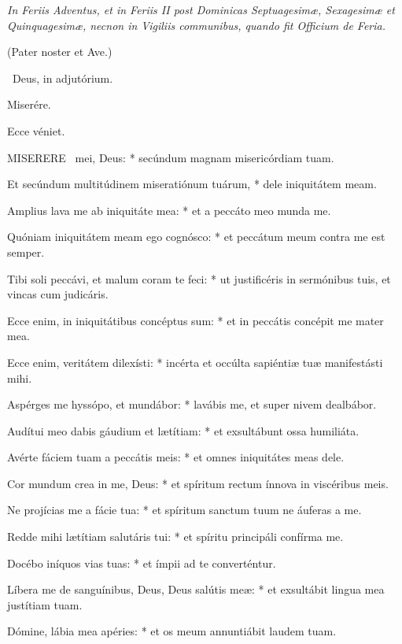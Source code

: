 
\sectionornament


\textit{In Feriis Adventus, et in Feriis II post Dominicas Septuagesimæ, Sexagesimæ et Quinquagesimæ, necnon in Vigiliis communibus, quando fit Officium de Feria.}

(Pater noster et Ave.)

\V\ Deus, in adjutórium.

 Miserére. \textdagger

  Ecce véniet.


\lettrine[lines=2]{M}{ISERERE} \textdagger\ mei, Deus: * secúndum magnam misericórdiam tuam.

Et secúndum multitúdinem miseratiónum tuárum, * dele iniquitátem meam.

Amplius lava me ab iniquitáte mea: * et a peccáto meo munda me.

Quóniam iniquitátem meam ego cognósco: * et peccátum meum contra me est semper.

Tibi soli peccávi, et malum coram te feci: * ut justificéris in sermónibus tuis, et vincas cum judicáris.

Ecce enim, in iniquitátibus concéptus sum: * et in peccátis concépit me mater mea.

Ecce enim, veritátem dilexísti: * incérta et occúlta sapiéntiæ tuæ manifestásti mihi.

Aspérges me hyssópo, et mundábor: * lavábis me, et super nivem dealbábor.

Audítui meo dabis gáudium et lætítiam: * et exsultábunt ossa humiliáta.

Avérte fáciem tuam a peccátis meis: * et omnes iniquitátes meas dele.

Cor mundum crea in me, Deus: * et spíritum rectum ínnova in viscéribus meis.

Ne projícias me a fácie tua: * et spíritum sanctum tuum ne áuferas a me.

Redde mihi lætítiam salutáris tui: * et spíritu principáli confírma me.

Docébo iníquos vias tuas: * et ímpii ad te converténtur.

Líbera me de sanguínibus, Deus, Deus salútis meæ: * et exsultábit lingua mea justítiam tuam.

Dómine, lábia mea apéries: * et os meum annuntiábit laudem tuam.

